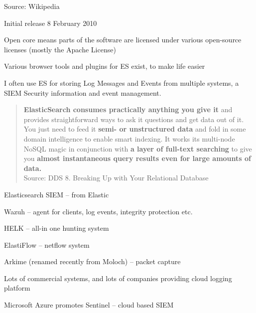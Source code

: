 \documentclass[Screen16to9,17pt]{foils}
\begin{document}
Source: Wikipedia 

\begin{list2}
\item Initial release	8 February 2010
\item Open core means parts of the software are licensed under various open-source licenses (mostly the Apache License)
\item Various browser tools and plugins for ES exist, to make life easier
\item I often use ES for storing Log Messages and Events from multiple systems, a SIEM Security information and event management.
\end{list2}




\begin{quote}\small
{\bf ElasticSearch consumes practically anything you give it} and provides straightforward ways to ask it questions and get data out of it. You just need to feed it {\bf semi- or unstructured data} and fold in some domain intelligence to enable smart indexing. It works its multi-node NoSQL magic in conjunction with {\bf a layer of full-text searching} to give you {\bf almost instantaneous query results even for large amounts of data.}\\
Source: DDS 8. Breaking Up with Your Relational Database
\end{quote}

\begin{list2}
\item Elasticsearch SIEM -- from Elastic
\item Wazuh -- agent for clients, log events, integrity protection etc.
\item HELK -- all-in one hunting system
\item ElastiFlow -- netflow system
\item Arkime (renamed recently from Moloch) -- packet capture
\end{list2}

Lots of commercial systems, and lots of companies providing cloud logging platform

Microsoft Azure promotes Sentinel -- cloud based SIEM\\ {\footnotesize
{}}


\end{document}
